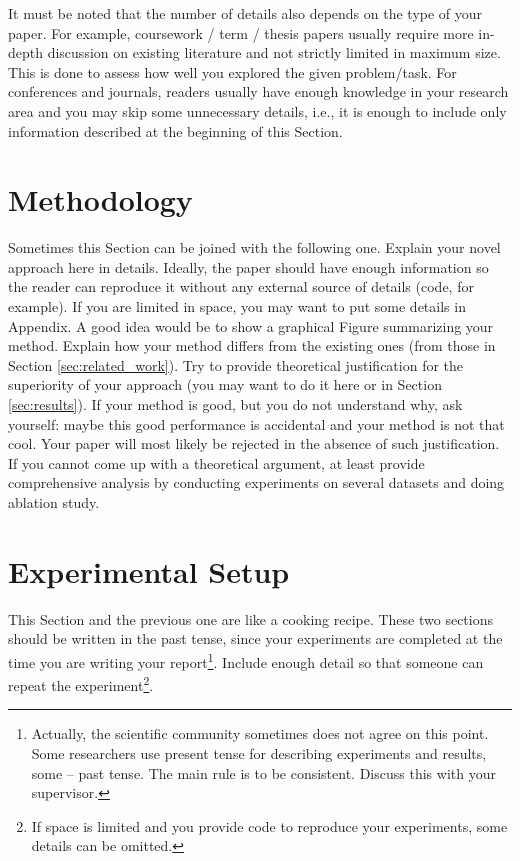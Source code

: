 \documentclass[10pt,conference,compsocconf]{IEEEtran}
\begin{document}
It must be noted that the number of details also depends on the type of your paper. For example, coursework / term / thesis papers usually require more in-depth discussion on existing literature and not strictly limited in maximum size. This is done to assess how well you explored the given problem/task. For conferences and journals, readers usually have enough knowledge in your research area and you may skip some unnecessary details, i.e., it is enough to include only information described at the beginning of this Section.

\section{Methodology}\label{sec:methodology}
Sometimes this Section can be joined with the following one. Explain your novel approach here in details. Ideally, the paper should have enough information so the reader can reproduce it without any external source of details (code, for example). If you are limited in space, you may want to put some details in Appendix. A good idea would be to show a graphical Figure summarizing your method. Explain how your method differs from the existing ones (from those in Section \ref{sec:related_work}). Try to provide theoretical justification for the superiority of your approach (you may want to do it here or in Section \ref{sec:results}). If your method is good, but you do not understand why, ask yourself: maybe this good performance is accidental and your method is not that cool. Your paper will most likely be rejected in the absence of such justification. If you cannot come up with a theoretical argument, at least provide comprehensive analysis by conducting experiments on several datasets and doing ablation study.

\section{Experimental Setup}\label{sec:experimental_setup}
This Section and the previous one are like a cooking recipe. These two sections should be written in the past tense, since your experiments are completed at the time you are writing your report\footnote{Actually, the scientific community sometimes does not agree on this point. Some researchers use present tense for describing experiments and results, some -- past tense. The main rule is to be consistent. Discuss this with your supervisor.\label{footnote:tense}}. Include enough detail so that someone can repeat the experiment\footnote{If space is limited and you provide code to reproduce your experiments, some details can be omitted.}. 
\end{document}
